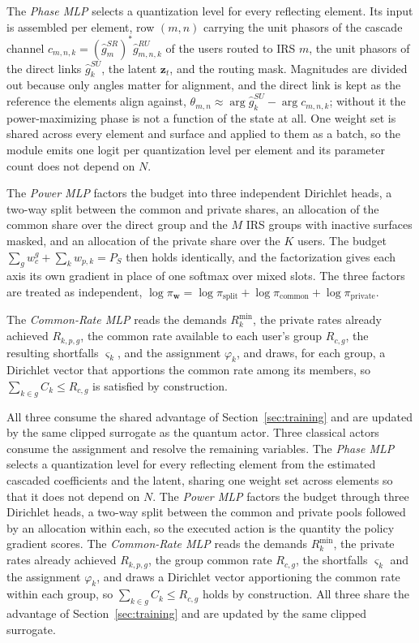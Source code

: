 \documentclass[12pt,onecolumn]{IEEEtran}
\begin{document}
The \emph{Phase MLP} selects a quantization level for every reflecting element.
Its input is assembled per element, row $(m,n)$ carrying the unit phasors of the cascade channel $c_{m,n,k}=(\hat{g}^{SR}_m)^{*}\hat{g}^{RU}_{m,n,k}$ of the users routed to IRS $m$, the unit phasors of the direct links $\hat{g}^{SU}_k$, the latent $\mathbf{z}_t$, and the routing mask.
Magnitudes are divided out because only angles matter for alignment, and the direct link is kept as the reference the elements align against, $\theta_{m,n} \approx \arg \hat{g}^{SU}_k - \arg c_{m,n,k}$; without it the power-maximizing phase is not a function of the state at all.
One weight set is shared across every element and surface and applied to them as a batch, so the module emits one logit per quantization level per element and its parameter count does not depend on $N$.

The \emph{Power MLP} factors the budget into three independent Dirichlet heads, a two-way split between the common and private shares, an allocation of the common share over the direct group and the $M$ IRS groups with inactive surfaces masked, and an allocation of the private share over the $K$ users.
The budget $\sum_g w_c^g + \sum_k w_{p,k} = P_S$ then holds identically, and the factorization gives each axis its own gradient in place of one softmax over mixed slots.
The three factors are treated as independent, $\log\pi_{\mathbf{w}} = \log\pi_{\mathrm{split}} + \log\pi_{\mathrm{common}} + \log\pi_{\mathrm{private}}$.

The \emph{Common-Rate MLP} reads the demands $R_k^{\min}$, the private rates already achieved $R_{k,p,g}$, the common rate available to each user's group $R_{c,g}$, the resulting shortfalls $\varsigma_k$, and the assignment $\varphi_k$, and draws, for each group, a Dirichlet vector that apportions the common rate among its members, so $\sum_{k \in g} C_k \le R_{c,g}$ is satisfied by construction.

All three consume the shared advantage of Section~\ref{sec:training} and are updated by the same clipped surrogate as the quantum actor.
\else
Three classical actors consume the assignment and resolve the remaining variables. The
\emph{Phase MLP} selects a quantization level for every reflecting element from the
estimated cascaded coefficients and the latent, sharing one weight set across elements so
that it does not depend on $N$. The \emph{Power MLP} factors the budget through three
Dirichlet heads, a two-way split between the common and private pools followed by an
allocation within each, so the executed action is the quantity the policy gradient scores.
The \emph{Common-Rate MLP} reads the demands $R_k^{\min}$, the private rates already
achieved $R_{k,p,g}$, the group common rate $R_{c,g}$, the shortfalls $\varsigma_k$ and the
assignment $\varphi_k$, and draws a Dirichlet vector apportioning the common rate within
each group, so $\sum_{k \in g} C_k \le R_{c,g}$ holds by construction. All three share the
advantage of Section~\ref{sec:training} and are updated by the same clipped surrogate.
\fi
\end{document}
